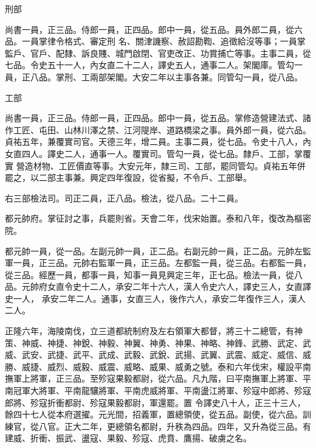 \begin{pinyinscope}
 刑部



 尚書一員，正三品。侍郎一員，正四品。郎中一員，從五品。員外郎二員，從六品。一員掌律令格式、審定刑
 名、關津譏察、赦詔勘鞫、追徵給沒等事；一員掌監戶、官戶、配隸、訴良賤、城門啟閉、官吏改正、功賞捕亡等事。主事二員，從七品。令史五十一人，內女直二十二人，譯史五人，通事二人。架閣庫。管勾一員，正八品。掌刑、工兩部架閣。大安二年以主事各兼。同管勾一員，從八品。



 工部



 尚書一員，正三品。侍郎一員，正四品。郎中一員，從五品。掌修造營建法式、諸作工匠、屯田、山林川澤之禁、江河隄岸、道路橋梁之事。員外郎一員，從六品。貞祐五年，兼覆實司官。天德三年，增二員。主事二員，從七品。令史十八人，內女直四人。譯史二人，通事一人。覆實司。管勾一員，從七品。隸戶、工部，掌覆實
 營造材物、工匠價直等事。大安元年，隸三司、工部，罷同管勾。貞祐五年併罷之，以二部主事兼。興定四年復設，從省擬，不令戶、工部舉。



 右三部檢法司。司正二員，正八品。檢法，從八品。二十二員。



 都元帥府。掌征討之事，兵罷則省。天會二年，伐宋始置。泰和八年，復改為樞密院。



 都元帥一員，從一品。左副元帥一員，正二品。右副元帥一員，正二品。元帥左監軍一員，正三品。元帥右監軍一員，正三品。左都監一員，從三品。右都監一員，從三品。經歷一員，都事一員，知事一員見興定三年，正七品。檢法一員，從八品。元帥府女直令史十二人，承安二年十六人，漢人令史六人，譯史三人，女直譯史一人，
 承安二年二人。通事，女直三人，後作六人，承安二年復作三人，漢人二人。



 正隆六年，海陵南伐，立三道都統制府及左右領軍大都督，將三十二總管，有神策、神威、神捷、神銳、神毅、神翼、神勇、神果、神略、神鋒、武勝、武定、武威、武安、武捷、武平、武成、武毅、武銳、武揚、武翼、武震、威定、威信、威勝、威捷、威烈、威毅、威震、威略、威果、威勇之號。泰和六年伐宋，權設平南撫軍上將軍，正三品。至殄寇果毅都尉，從六品。凡九階，曰平南撫軍上將軍、平南冠軍大將軍、平南龍驤將軍、平南虎威將軍、平南盪江將軍、殄寇中郎將、殄寇郎將、殄寇折衝都尉、殄寇果毅都尉，軍還罷。置
 令譯史八十人，正三十三人，餘四十七人從本府選擢。元光間，招義軍，置總領使，從五品。副使，從六品。訓練官，從八官。正大二年，更總領名都尉，升秩為四品。四年，又升為從三品。有建威、折衝、振武、盪寇、果毅、殄寇、虎賁、鷹揚、破虜之名。




\end{pinyinscope}
